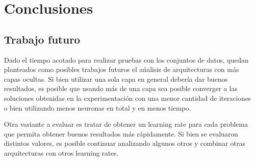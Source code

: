 \documentclass[informe.tex]{subfiles}
\begin{document}
  
  \section{Conclusiones}
  
  
    \subsection{Trabajo futuro}
    
      Dado el tiempo acotado para realizar pruebas con los conjuntos de datos, quedan planteados como posibles trabajos futuros el ańalisis de arquitecturas con más capas ocultas. Si bien utilizar una sola capa en general debería dar buenos resultados, es posible que usando más de una capa sea posible converger a las soluciones obtenidas en la experimentación con una menor cantidad de iteraciones o bien utilizando menos neuronas en total y en menos tiempo.
      
      Otra variante a evaluar es tratar de obtener un learning rate para cada problema que permita obtener buenos resultados m\'as r\'apidamente. Si bien se evaluaron distintos valores, es posible continuar analizando algunos otros y combinar otras arquitecturas con otros learning rates.
\end{document}

